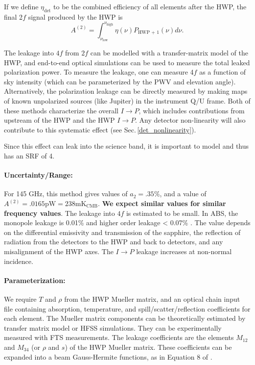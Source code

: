 If we define $\eta_\text{det}$ to be the combined efficiency of all elements after the HWP,
the final 2$f$ signal produced by the HWP is 
\[
A^{(2)} = \int_{\nu_\text{low}}^{\nu_\text{high}} \eta(\nu) P_\text{HWP + 1}(\nu) d\nu.
\]

The leakage into $4f$ from $2f$ can be modelled with a transfer-matrix model of the HWP, and end-to-end optical simulations can be used to measure the total leaked polarization power. To measure the leakage, one can measure 4$f$ as a function of sky intensity (which can be parameterized by the PWV and elevation angle). Alternatively, the polarization leakage can be directly measured by making maps of known unpolarized sources (like Jupiter) in the instrument Q/U frame. Both of these methods characterize the overall $I \rightarrow P$, which includes contributions from upstream of the HWP and the HWP $I \rightarrow P$. Any detector non-linearity will also contribute to this systematic effect (see Sec.\,\ref{det_nonlinearity}).

Since this effect can leak into the science band, it is important to model and thus has an SRF of 4.

\paragraph{Uncertainty/Range:}
For 145 GHz, this method gives values of $a_2 = .35\%$, and a value of 
$A^{(2)} = .0165 \text{pW} = 238 \text{mK}_\text{CMB}$. 
\textbf{We expect similar values for similar frequency values}.
The leakage into $4f$ is estimated to be small. In ABS, the monopole leakage is 0.01\% and higher order leakage < 0.07\% \cite{Essinger-Hileman2016}. The value depends on the differential emissivity and transmission of the sapphire, the reflection of radiation from the detectors to the HWP and back to detectors, and any misalignment of the HWP axes. The $I \rightarrow P$ leakage increases at non-normal incidence.

\paragraph{Parameterization:}
We require $T$ and $\rho$ from the HWP Mueller matrix\cite{Salatino16}, and an optical chain input file containing
absorption, temperature, and spill/scatter/reflection coefficients for each element. The Mueller matrix components can be theoretically estimated by transfer matrix model \cite{Essinger-Hileman13} or HFSS simulations. They can be experimentally measured with FTS measurements. The leakage coefficients are the elements $M_{12}$ and $M_{34}$ (or $\rho$ and $s$) of the HWP Mueller matrix. These coefficients can be expanded into a beam Gauss-Hermite functions, as in Equation 8 of \cite{Essinger-Hileman2016}.


